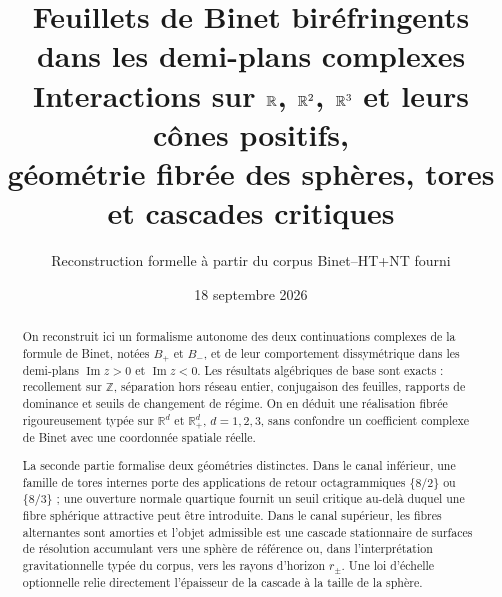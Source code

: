 \documentclass[11pt,a4paper]{article}
\title{\textbf{Feuillets de Binet biréfringents dans les demi-plans complexes}\\[0.35em]
\large Interactions sur $\R$, $\R^2$, $\R^3$ et leurs cônes positifs,\\
géométrie fibrée des sphères, tores et cascades critiques}
\author{Reconstruction formelle à partir du corpus Binet--HT+NT fourni}
\date{18 septembre 2026}
\newcommand{\R}{\mathbb R}
\newcommand{\Z}{\mathbb Z}
\newcommand{\Rp}{\mathbb R_{+}}
\newcommand{\Ima}{\operatorname{Im}}
\begin{document}
\maketitle

\begin{abstract}
On reconstruit ici un formalisme autonome des deux continuations complexes de la formule de Binet, notées $B_+$ et $B_-$, et de leur comportement dissymétrique dans les demi-plans $\Ima z>0$ et $\Ima z<0$. Les résultats algébriques de base sont exacts : recollement sur $\Z$, séparation hors réseau entier, conjugaison des feuilles, rapports de dominance et seuils de changement de régime. On en déduit une réalisation fibrée rigoureusement typée sur $\R^d$ et $\Rp^d$, $d=1,2,3$, sans confondre un coefficient complexe de Binet avec une coordonnée spatiale réelle.

La seconde partie formalise deux géométries distinctes. Dans le canal inférieur, une famille de tores internes porte des applications de retour octagrammiques $\{8/2\}$ ou $\{8/3\}$ ; une ouverture normale quartique fournit un seuil critique au-delà duquel une fibre sphérique attractive peut être introduite. Dans le canal supérieur, les fibres alternantes sont amorties et l'objet admissible est une cascade stationnaire de surfaces de résolution accumulant vers une sphère de référence ou, dans l'interprétation gravitationnelle typée du corpus, vers les rayons d'horizon $r_\pm$. Une loi d'échelle optionnelle relie directement l'épaisseur de la cascade à la taille de la sphère.


\end{abstract}
\end{document}
